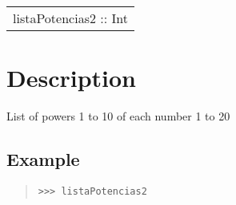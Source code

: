 \begin{haddockdesc}
\item[\begin{tabular}{@{}l}
listaPotencias2 :: {\char 91}{\char 91}Int{\char 93}{\char 93}
\end{tabular}]
{\haddockbegindoc
\section*{Description}
List of powers 1 to 10 of each number 1 to 20\par
\subsection*{Example}
\begin{quote}
{\haddockverb\begin{verbatim}
>>> listaPotencias2

\end{verbatim}}
\end{quote}}
\end{haddockdesc}
